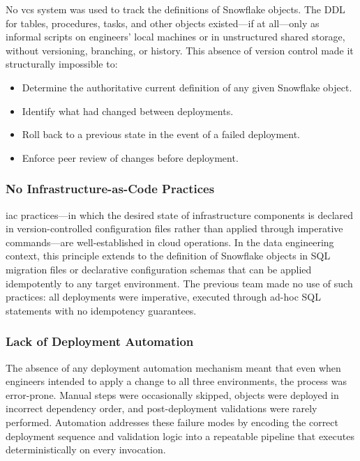 No \gls{vcs} system was used to track the definitions of Snowflake objects. The DDL for tables, procedures, tasks, and other objects existed---if at all---only as informal scripts on engineers' local machines or in unstructured shared storage, without versioning, branching, or history. This absence of version control made it structurally impossible to:

\begin{itemize}
  \item Determine the authoritative current definition of any given Snowflake object.
  \item Identify what had changed between deployments.
  \item Roll back to a previous state in the event of a failed deployment.
  \item Enforce peer review of changes before deployment.
\end{itemize}

\subsubsection{No Infrastructure-as-Code Practices}

\gls{iac} practices---in which the desired state of infrastructure components is declared in version-controlled configuration files rather than applied through imperative commands---are well-established in cloud operations. In the data engineering context, this principle extends to the definition of Snowflake objects in SQL migration files or declarative configuration schemas that can be applied idempotently to any target environment. The previous team made no use of such practices: all deployments were imperative, executed through ad-hoc SQL statements with no idempotency guarantees.

\subsubsection{Lack of Deployment Automation}

The absence of any deployment automation mechanism meant that even when engineers intended to apply a change to all three environments, the process was error-prone. Manual steps were occasionally skipped, objects were deployed in incorrect dependency order, and post-deployment validations were rarely performed. Automation addresses these failure modes by encoding the correct deployment sequence and validation logic into a repeatable pipeline that executes deterministically on every invocation.




